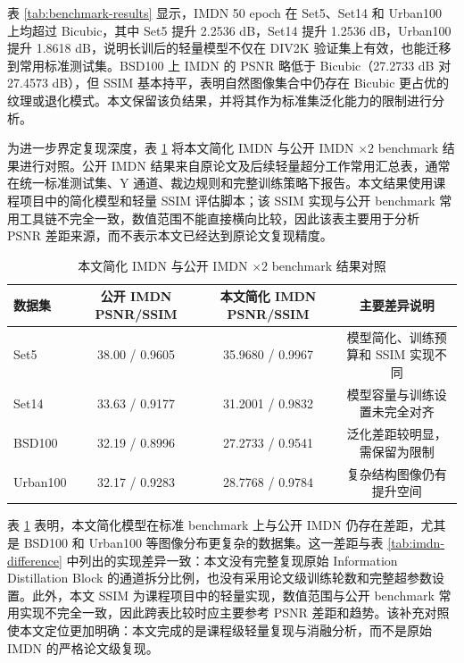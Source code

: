 \documentclass[bwprint]{report}
\begin{document}
表 \ref{tab:benchmark-results} 显示，IMDN 50 epoch 在 Set5、Set14 和 Urban100 上均超过 Bicubic，其中 Set5 提升 2.2536 dB，Set14 提升 1.2536 dB，Urban100 提升 1.8618 dB，说明长训后的轻量模型不仅在 DIV2K 验证集上有效，也能迁移到常用标准测试集。BSD100 上 IMDN 的 PSNR 略低于 Bicubic（27.2733 dB 对 27.4573 dB），但 SSIM 基本持平，表明自然图像集合中仍存在 Bicubic 更占优的纹理或退化模式。本文保留该负结果，并将其作为标准集泛化能力的限制进行分析。

为进一步界定复现深度，表 \ref{tab:imdn-public-comparison} 将本文简化 IMDN 与公开 IMDN $\times2$ benchmark 结果进行对照。公开 IMDN 结果来自原论文及后续轻量超分工作常用汇总表\cite{hui2019imdn}，通常在统一标准测试集、Y 通道、裁边规则和完整训练策略下报告。本文结果使用课程项目中的简化模型和轻量 SSIM 评估脚本；该 SSIM 实现与公开 benchmark 常用工具链不完全一致，数值范围不能直接横向比较，因此该表主要用于分析 PSNR 差距来源，而不表示本文已经达到原论文复现精度。

\begin{table}[H]
    \centering
    \caption{本文简化 IMDN 与公开 IMDN $\times2$ benchmark 结果对照}
    \label{tab:imdn-public-comparison}
    \small
    \begin{tabular}{lccc}
        \toprule
        数据集 & 公开 IMDN PSNR/SSIM & 本文简化 IMDN PSNR/SSIM & 主要差异说明 \\
        \midrule
        Set5 & 38.00 / 0.9605 & 35.9680 / 0.9967 & 模型简化、训练预算和 SSIM 实现不同 \\
        Set14 & 33.63 / 0.9177 & 31.2001 / 0.9832 & 模型容量与训练设置未完全对齐 \\
        BSD100 & 32.19 / 0.8996 & 27.2733 / 0.9541 & 泛化差距较明显，需保留为限制 \\
        Urban100 & 32.17 / 0.9283 & 28.7768 / 0.9784 & 复杂结构图像仍有提升空间 \\
        \bottomrule
    \end{tabular}
\end{table}

表 \ref{tab:imdn-public-comparison} 表明，本文简化模型在标准 benchmark 上与公开 IMDN 仍存在差距，尤其是 BSD100 和 Urban100 等图像分布更复杂的数据集。这一差距与表 \ref{tab:imdn-difference} 中列出的实现差异一致：本文没有完整复现原始 Information Distillation Block 的通道拆分比例，也没有采用论文级训练轮数和完整超参数设置。此外，本文 SSIM 为课程项目中的轻量实现，数值范围与公开 benchmark 常用实现不完全一致，因此跨表比较时应主要参考 PSNR 差距和趋势。该补充对照使本文定位更加明确：本文完成的是课程级轻量复现与消融分析，而不是原始 IMDN 的严格论文级复现。
\end{document}
